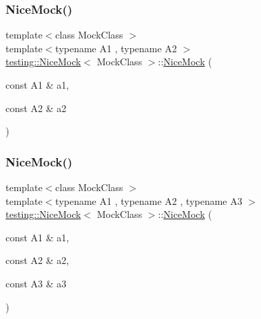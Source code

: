\subsubsection{\texorpdfstring{NiceMock()}{NiceMock()}\hspace{0.1cm}{\footnotesize\ttfamily [3/11]}}
{\footnotesize\ttfamily template$<$class Mock\+Class $>$ \\
template$<$typename A1 , typename A2 $>$ \\
\mbox{\hyperlink{classtesting_1_1NiceMock}{testing\+::\+Nice\+Mock}}$<$ Mock\+Class $>$\+::\mbox{\hyperlink{classtesting_1_1NiceMock}{Nice\+Mock}} (\begin{DoxyParamCaption}\item[{const A1 \&}]{a1,  }\item[{const A2 \&}]{a2 }\end{DoxyParamCaption})\hspace{0.3cm}{\ttfamily [inline]}}

\mbox{\label{classtesting_1_1NiceMock_a0b91bd74b497626bb81d07c3d4b59d22}} 
\subsubsection{\texorpdfstring{NiceMock()}{NiceMock()}\hspace{0.1cm}{\footnotesize\ttfamily [4/11]}}
{\footnotesize\ttfamily template$<$class Mock\+Class $>$ \\
template$<$typename A1 , typename A2 , typename A3 $>$ \\
\mbox{\hyperlink{classtesting_1_1NiceMock}{testing\+::\+Nice\+Mock}}$<$ Mock\+Class $>$\+::\mbox{\hyperlink{classtesting_1_1NiceMock}{Nice\+Mock}} (\begin{DoxyParamCaption}\item[{const A1 \&}]{a1,  }\item[{const A2 \&}]{a2,  }\item[{const A3 \&}]{a3 }\end{DoxyParamCaption})\hspace{0.3cm}{\ttfamily [inline]}}

\mbox{\label{classtesting_1_1NiceMock_a5ffbe1a648f16612266d4e67a2d063d1}} 
